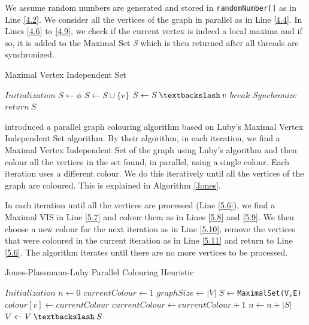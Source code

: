 \documentclass[MTech]{iitmdiss}
\begin{document}
We assume random numbers are generated and stored in \verb+randomNumber[]+ as in Line \ref{4.2}. We consider all the vertices of the graph in parallel as in Line \ref{4.4}. In Lines \ref{4.6} to \ref{4.9}, we check if the current vertex is indeed a local maxima and if so, it is added to the Maximal Set \textit{S} which is then returned after all threads are synchronized.  

\begin{algorithm}
\caption{Maximal Vertex Independent Set}\label{Luby}
\begin{algorithmic}[1]
\State $\textit{Initialization}$ \label{4.2}
\State $S \gets \phi$
 \label{4.4}
\State $S \gets S \cup \{v\}$
 \label{4.6}
\State $S \gets S \: \textbackslash \: v$
\State $\textit{break}$ \label{4.9}
\EndIf
\EndFor
\EndFor
\State \textit{Synchronize}
\State $\textit{return} \: S$
\EndProcedure
\end{algorithmic}
\end{algorithm}

\citet{Jones:1993:PGC:153109.153119} introduced a parallel graph colouring algorithm based on Luby's Maximal Vertex Independent Set algorithm. By their algorithm, in each iteration, we find a Maximal Vertex Independent Set of the graph using Luby's algorithm and then colour all the vertices in the set found, in parallel, using a single colour. Each iteration uses a different colour. We do this iteratively until all the vertices of the graph are coloured. This is explained in Algorithm \ref{Jones}.

In each iteration until all the vertices are processed (Line \ref{5.6}), we find a Maximal VIS in Line \ref{5.7} and colour them as in Lines \ref{5.8} and \ref{5.9}. We then choose a new colour for the next iteration as in Line \ref{5.10}, remove the vertices that were coloured in the current iteration as in Line \ref{5.11} and return to Line \ref{5.6}. The algorithm iterates until there are no more vertices to be processed.

\begin{algorithm}
\caption{Jones-Plassmann-Luby Parallel Colouring Heuristic}\label{Jones}
\begin{algorithmic}[1]
\State $\textit{Initialization}$
\State $n \gets 0$
\State $currentColour \gets 1$
\State $graphSize \gets |V|$
  \label{5.6}
\State $S \gets $\verb+MaximalSet(V,E)+ \label{5.7}
 \label{5.8}
\State $colour[v] \gets currentColour$ \label{5.9}
\EndFor
\State $currentColour \gets currentColour+1$ \label{5.10}
\State $n \gets n+|S|$
\State $V \gets V \: \textbackslash \: S$ \label{5.11}
\EndWhile
\EndProcedure
\end{algorithmic}
\end{algorithm}
\end{document}
